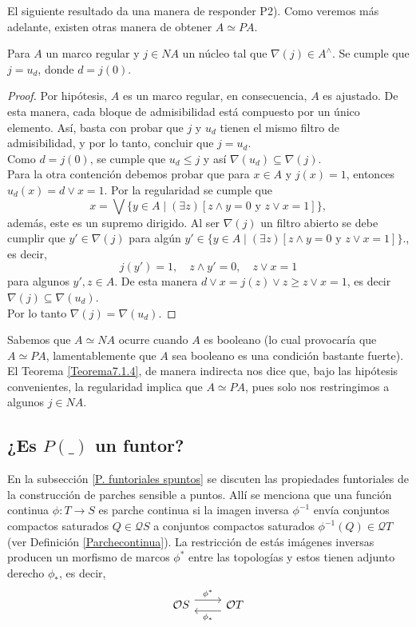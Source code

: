 El siguiente resultado da una manera de responder P2). Como veremos más adelante, existen otras manera de obtener $A\simeq PA$.

\begin{thm}\label{Teorema7.1.4}
    Para $A$ un marco regular y $j\in NA$ un núcleo tal que $\nabla(j)\in A^\wedge$. Se cumple que $j=u_d$, donde $d=j(0)$. 
\end{thm}

\begin{proof}
    Por hipótesis, $A$ es un marco regular, en consecuencia, $A$ es ajustado. De esta manera, cada bloque de admisibilidad está compuesto por un único elemento. Así, basta con probar que $j$ y $u_d$ tienen el mismo filtro de admisibilidad, y por lo tanto, concluir que $j=u_d$.\\

    Como $d=j(0)$, se cumple que $u_d\leq j$ y así $\nabla(u_d)\subseteq \nabla(j)$.\\
    
    Para la otra contención debemos probar que para $x\in A$ y $j(x)=1$, entonces $u_d(x)=d\vee x=1$. Por la regularidad se cumple que 
    \[
    x=\bigvee\{y\in A\mid (\exists z)[z\wedge y=0 \mbox{ y } z\vee x=1]\},
    \]
    además, este es un supremo dirigido. Al ser $\nabla(j)$ un filtro abierto se debe cumplir que $y'\in\nabla(j)$ para algún $y'\in \{y\in A\mid (\exists z)[z\wedge y=0 \mbox{ y } z\vee x=1]\}$., es decir,
    \[
    j(y')=1, \quad z\wedge y'=0, \quad z\vee x=1
    \]
    para algunos $y', z\in A$. De esta manera $d\vee x=j(z)\vee z\geq z\vee x=1$, es decir $\nabla(j)\subseteq\nabla(u_d)$.\\

    Por lo tanto $\nabla(j)=\nabla(u_d)$.
\end{proof}

Sabemos que $A\simeq NA$ ocurre cuando $A$ es booleano (lo cual provocaría que $A\simeq PA$, lamentablemente que $A$ sea booleano es una condición bastante fuerte). El Teorema \ref{Teorema7.1.4}, de manera indirecta nos dice que, bajo las hipótesis convenientes, la regularidad implica que $A\simeq PA$, pues solo nos restringimos a algunos $j\in NA$.

\subsection{¿Es $P( \_ )$ un funtor?}

En la subsección \ref{P. funtoriales spuntos} se discuten las propiedades funtoriales de la construcción de parches sensible a puntos. Allí se menciona que una función continua $\phi\colon T\to S$ es parche continua si la imagen inversa $\phi^{-1}$ envía conjuntos compactos saturados $Q\in \mathcal{Q}S$ a conjuntos compactos saturados $\phi^{-1}(Q)\in \mathcal{Q}T$ (ver Definición \ref{Parchecontinua}). La restricción de estás imágenes inversas producen un morfismo de marcos $\phi^*$ entre las topologías y estos tienen adjunto derecho $\phi_*$, es decir,
\[\begin{tikzcd}
	{\mathcal{O}S} & {\mathcal{O}T}
	\arrow["{\phi^*}", shift left=2, from=1-1, to=1-2]
	\arrow["{\phi_*}", shift left=2, from=1-2, to=1-1]
\end{tikzcd}\]

